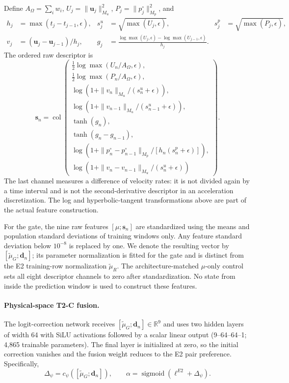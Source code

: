 Define $A_\Omega=\sum_i w_i$, $U_j=\|\bm u_j\|_{M_u}^2$, $P_j=\|p_j^\circ\|_{M_p}^2$, and
\begin{align}
 h_j&=\max(t_j-t_{j-1},\epsilon),&
 s_j^u&=\sqrt{\max(U_j,\epsilon)},&
 s_j^p&=\sqrt{\max(P_j,\epsilon)},\\
 v_j&=(\bm u_j-\bm u_{j-1})/h_j,&
 g_j&=\frac{\log\max(U_j,\epsilon)-\log\max(U_{j-1},\epsilon)}{h_j}.
\end{align}
The ordered raw descriptor is
\begin{equation}
\bm s_n=\operatorname{col}\left(
\begin{array}{l}
 \tfrac12\log\max(U_n/A_\Omega,\epsilon),\\
 \tfrac12\log\max(P_n/A_\Omega,\epsilon),\\
 \log(1+\|v_n\|_{M_u}/(s_n^u+\epsilon)),\\
 \log(1+\|v_{n-1}\|_{M_u}/(s_{n-1}^u+\epsilon)),\\
 \tanh(g_n),\\
 \tanh(g_n-g_{n-1}),\\
 \log(1+\|p_n^\circ-p_{n-1}^\circ\|_{M_p}/[h_n(s_n^p+\epsilon)]),\\
 \log(1+\|v_n-v_{n-1}\|_{M_u}/(s_n^u+\epsilon))
\end{array}\right).
\label{eq:app_t2c_descriptor}
\end{equation}
The last channel measures a difference of velocity rates: it is not divided again by a time interval and is not the second-derivative descriptor in an acceleration discretization. The log and hyperbolic-tangent transformations above are part of the actual feature construction.

For the gate, the nine raw features $[\mu;\bm s_n]$ are standardized using the means and population standard deviations of training windows only. Any feature standard deviation below $10^{-8}$ is replaced by one. We denote the resulting vector by $[\widetilde\mu_G;\bm d_n]$; its parameter normalization is fitted for the gate and is distinct from the E2 training-row normalization $\widetilde\mu_R$. The architecture-matched $\mu$-only control sets all eight descriptor channels to zero after standardization. No state from inside the prediction window is used to construct these features.


\paragraph{Physical-space T2-C fusion.}
The logit-correction network receives
$[\widetilde\mu_G;\bm d_n]\in\mathbb R^9$ and uses two hidden layers of width 64 with SiLU
activations followed by a scalar linear output (9--64--64--1; 4,865 trainable parameters).
The final layer is initialized at zero, so the initial correction vanishes
and the fusion weight reduces to the E2 pair preference.
Specifically,
\begin{equation}
  \Delta_\psi
  =
  c_\psi
  \left(
    [\widetilde\mu_G;\bm d_n]
  \right),
  \qquad
  \alpha
  =
  \operatorname{sigmoid}
  \left(
    \ell^{E2}+\Delta_\psi
  \right).
  \label{eq:app_t2c_gate}
\end{equation}

